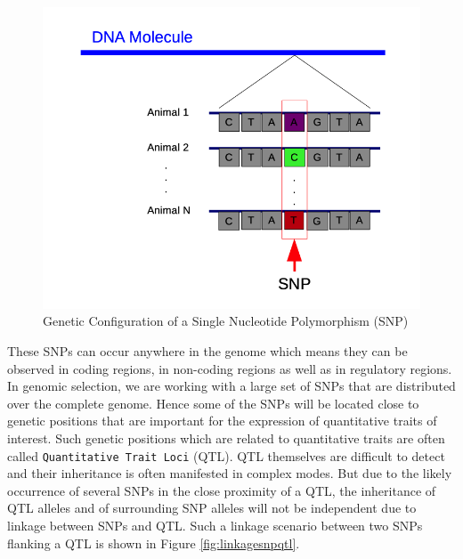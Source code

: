 \documentclass[]{book}
\theoremstyle{definition}
\theoremstyle{definition}
\theoremstyle{definition}
\theoremstyle{remark}
\begin{document}
\begin{figure}
\centering
\includegraphics{odg/snpgeneticconfiguration.png}
\caption{\label{fig:snpgeneticconfiguration}Genetic Configuration of a Single Nucleotide Polymorphism (SNP)}
\end{figure}

These SNPs can occur anywhere in the genome which means they can be observed in coding regions, in non-coding regions as well as in regulatory regions. In genomic selection, we are working with a large set of SNPs that are distributed over the complete genome. Hence some of the SNPs will be located close to genetic positions that are important for the expression of quantitative traits of interest. Such genetic positions which are related to quantitative traits are often called \texttt{Quantitative\ Trait\ Loci} (QTL). QTL themselves are difficult to detect and their inheritance is often manifested in complex modes. But due to the likely occurrence of several SNPs in the close proximity of a QTL, the inheritance of QTL alleles and of surrounding SNP alleles will not be independent due to linkage between SNPs and QTL. Such a linkage scenario between two SNPs flanking a QTL is shown in Figure \ref{fig:linkagesnpqtl}.
\end{document}
